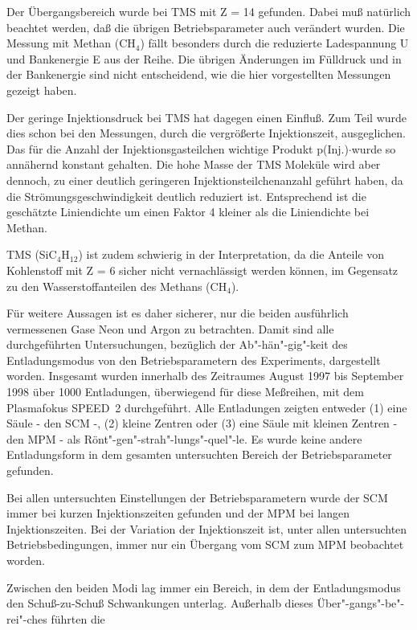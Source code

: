 Der Übergangsbereich wurde bei TMS mit Z = 14 gefunden. Dabei muß
natürlich beachtet werden, daß die übrigen Betriebsparameter auch
verändert wurden. Die Messung mit Methan (CH$_4$) fällt besonders durch
die reduzierte Ladespannung U und Bankenergie E aus der Reihe. Die
übrigen Änderungen im Fülldruck und in der Bankenergie sind nicht
entscheidend, wie die hier vorgestellten Messungen gezeigt haben.
\par
Der geringe Injektionsdruck bei TMS hat dagegen einen Einfluß. Zum Teil
wurde dies schon bei den Messungen, durch die vergrößerte
Injektionszeit, ausgeglichen. Das für die Anzahl der
Injektionsgasteilchen wichtige Produkt p(Inj.)$\cdot$\teff wurde so
annähernd konstant gehalten. Die hohe Masse der TMS Moleküle wird aber
dennoch, zu einer deutlich geringeren Injektionsteilchenanzahl geführt
haben, da die Strömungsgeschwindigkeit deutlich reduziert ist.
Entsprechend ist die geschätzte Liniendichte um einen Faktor 4 kleiner
als die Liniendichte bei Methan.
\par
TMS (SiC$_4$H$_{12}$) ist zudem schwierig in der Interpretation, da die
Anteile von Kohlenstoff mit Z = 6 sicher nicht vernachlässigt werden
können, im Gegensatz zu den Wasserstoffanteilen des Methans (CH$_4$).
\par
Für weitere Aussagen ist es daher sicherer, nur die beiden ausführlich
vermessenen Gase Neon und Argon zu betrachten.
%
%
Damit sind alle durchgeführten Untersuchungen, bezüglich der
Ab"-hän"-gig"-keit des Entladungsmodus von den Betriebsparametern
des Experiments, dargestellt worden. Insgesamt wurden innerhalb
des Zeitraumes August 1997 bis September 1998 über 1000
Entladungen, überwiegend für diese Meßreihen, mit dem Plasmafokus
SPEED~2 durchgeführt. Alle Entladungen zeigten entweder (1) eine
Säule - den SCM -, (2) kleine Zentren oder (3) eine Säule mit
kleinen Zentren - den MPM - als Rönt"-gen"-strah"-lungs"-quel"-le.
Es wurde keine andere Entladungsform in dem gesamten untersuchten
Bereich der Betriebsparameter gefunden.
\par
Bei allen untersuchten Einstellungen der Betriebsparametern wurde der
SCM immer bei kurzen Injektionszeiten gefunden und der MPM bei langen
Injektionszeiten. Bei der Variation der Injektionszeit ist, unter allen
untersuchten Betriebsbedingungen, immer nur ein Übergang vom SCM zum
MPM beobachtet worden.
\par
Zwischen den beiden Modi lag immer ein Bereich, in dem der
Entladungsmodus den Schuß-zu-Schuß Schwankungen unterlag.
Außerhalb dieses Über"-gangs"-be"-rei"-ches führten die
